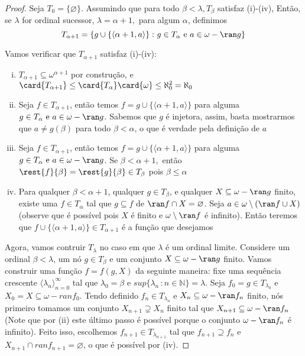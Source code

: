 \documentclass[a4paper]{article}
\theoremstyle{plain}\newtheorem{teo}{Teorema}[section]
\begin{document}
\begin{proof}
    
    Seja \(T_0=\{\varnothing\}\). Assumindo que para todo \(\beta<\lambda, T_\beta\) satisfaz (i)-(iv), Então, se \(\lambda\) for ordinal sucessor, \(\lambda=\alpha+1,\) para algum \(\alpha\), definimos
    \[T_{\alpha+1}=\{g\cup\{\langle \alpha+1, a\rangle\}\,\colon g\in
    T_\alpha \text{ e } a\in \omega -\ran g\}\]
    
    Vamos verificar que \(T_{\alpha+1}\) satisfaz (i)-(iv):
    \begin{enumerate}[(i)]
      \item \(T_{\alpha+1}\subseteq\omega^{\alpha+1}\) por construção, e \(\card{T_{\alpha+1}}\leq\card{T_\alpha}\card{\omega} \le \aleph_0^2=\aleph_0\)
      \item Seja \(f\in T_{\alpha+1}\), então temos \(f=g\cup\{\langle\alpha+1,a\rangle\}\) para alguma \(g\in
    T_\alpha \text{ e } a\in \omega -\ran g\). Sabemos que \(g\) é injetora, assim, basta mostrarmos que \(a\neq g(\beta)\) para todo \(\beta<\alpha\), o que é verdade pela definição de \(a\)
      \item Seja \(f\in T_{\alpha+1}\), então temos \(f=g\cup\{\langle\alpha+1,a\rangle\}\) para alguma \(g\in
    T_\alpha \text{ e } a\in \omega -\ran g\). Se \(\beta<\alpha+1,\) então \(\rest{f}{\beta}=\rest{g}{\beta}\in T_\beta\) pois \(\beta\leq\alpha\)
      \item Para qualquer \(\beta < \alpha+1\), qualquer \(g \in T_{\beta}\), e
    qualquer \(X \subseteq \omega - \ran g\) finito, existe uma \(f \in
    T_{\alpha}\) tal que \(g \subseteq f\) de \(\ran f \cap X = \varnothing\). Seja \(a\in\omega\setminus(\ran f\cup X)\) (observe que é possível pois \(X\) é finito e \(\omega\setminus\ran f\) é infinito). Então teremos que \(f\cup\{\langle\alpha+1,a\rangle\}\in T_{\alpha+1}\) é a função que desejamos
    \end{enumerate}
      
   Agora, vamos contruir \(T_{\lambda}\) no caso em que \(\lambda\) é um ordinal
   limite. Considere um ordinal \(\beta< \lambda\), um nó \(g \in T_{\beta}\) e
   um conjunto \(X \subseteq \omega - \ran g\) finito. Vamos construir uma
   função \(f = f(g, X)\) da seguinte maneira: fixe uma sequência
   crescente \(\langle \lambda_n \rangle_{n=0}^{\infty}\) tal que \(\lambda_0  =\beta\)
   e \(sup\{\lambda_n\,\colon n \in \mathbb{N}\} = \lambda\). Seja
   \(f_0 = g \in T_{\lambda_0}\) e \(X_0 = X \subseteq \omega - ranf_0\). Tendo
   definido \(f_n \in T_{\lambda_n}\) e \(X_n\subseteq \omega - \ran f_n\)
   finito, nós primeiro tomamos um conjunto \(X_{n+1} \supsetneq X_n\) finito tal
   que \(X_{n+1} \subseteq \omega - \ran f_n\) (Note que por (ii) este último passo é
   possível porque o conjunto \(\omega -\ran f_n\) é infinito).
   Feito isso, escolhemos \(f_{n+1} \in T_{\lambda_{n+1}}\) tal que \(f_{n+1}
   \supseteq f_n\) e  \(X_{n+1} \cap ranf_{n+1} = \varnothing\), o que é possível
   por (iv).
   

\end{proof}
\end{document}
